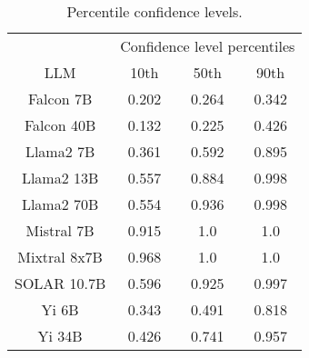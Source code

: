 \begin{table*}
\centering
\begin{tabular}{c|c|c|c}
& \multicolumn{3}{c}{Confidence level percentiles} \\ 
LLM & 10th & 50th & 90th\\ \hline
Falcon 7B & 0.202 & 0.264 & 0.342\\
Falcon 40B & 0.132 & 0.225 & 0.426\\
Llama2 7B & 0.361 & 0.592 & 0.895\\
Llama2 13B & 0.557 & 0.884 & 0.998\\
Llama2 70B & 0.554 & 0.936 & 0.998\\
Mistral 7B & 0.915 & 1.0 & 1.0\\
Mixtral 8x7B & 0.968 & 1.0 & 1.0\\
SOLAR 10.7B & 0.596 & 0.925 & 0.997\\
Yi 6B & 0.343 & 0.491 & 0.818\\
Yi 34B & 0.426 & 0.741 & 0.957\\
\hline
\end{tabular}
\caption{Percentile confidence levels.}
\label{tab:percentile_conf}
\end{table*}

